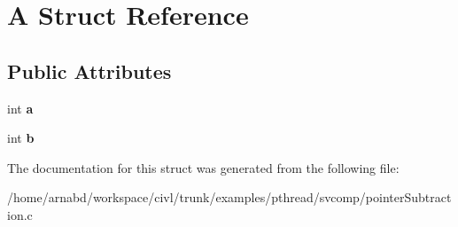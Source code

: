 \hypertarget{structA}{}\section{A Struct Reference}
\label{structA}
\subsection*{Public Attributes}
\begin{DoxyCompactItemize}
\item 
\hypertarget{structA_a49a53415abd8f1b26235579cc805a15f}{}int {\bfseries a}\label{structA_a49a53415abd8f1b26235579cc805a15f}

\item 
\hypertarget{structA_ae7b546d03dcbed7e380262d73fc56cf9}{}int {\bfseries b}\label{structA_ae7b546d03dcbed7e380262d73fc56cf9}

\end{DoxyCompactItemize}


The documentation for this struct was generated from the following file\+:\begin{DoxyCompactItemize}
\item 
/home/arnabd/workspace/civl/trunk/examples/pthread/svcomp/pointer\+Subtraction.\+c\end{DoxyCompactItemize}
